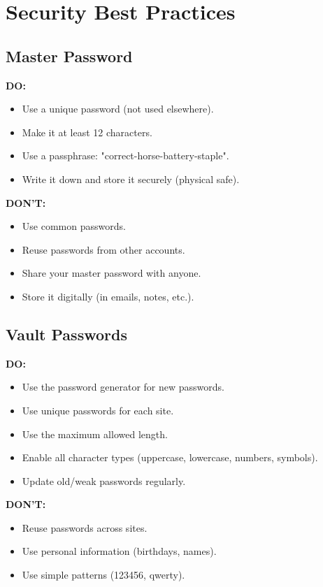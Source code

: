 \documentclass[11pt,a4paper]{article}
\begin{document}
\section{Security Best Practices}

\subsection{Master Password}
\textbf{DO:}
\begin{itemize}
    \item Use a unique password (not used elsewhere).
    \item Make it at least 12 characters.
    \item Use a passphrase: "correct-horse-battery-staple".
    \item Write it down and store it securely (physical safe).
\end{itemize}

\textbf{DON'T:}
\begin{itemize}
    \item Use common passwords.
    \item Reuse passwords from other accounts.
    \item Share your master password with anyone.
    \item Store it digitally (in emails, notes, etc.).
\end{itemize}

\subsection{Vault Passwords}
\textbf{DO:}
\begin{itemize}
    \item Use the password generator for new passwords.
    \item Use unique passwords for each site.
    \item Use the maximum allowed length.
    \item Enable all character types (uppercase, lowercase, numbers, symbols).
    \item Update old/weak passwords regularly.
\end{itemize}

\textbf{DON'T:}
\begin{itemize}
    \item Reuse passwords across sites.
    \item Use personal information (birthdays, names).
    \item Use simple patterns (123456, qwerty).
\end{itemize}
\end{document}

